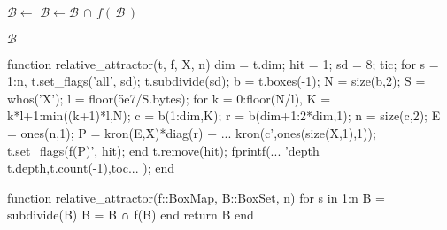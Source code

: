 \documentclass[12pt,a4paper,twoside]{article}
\begin{document}

\begin{algorithm}
    \begin{algorithmic}[1]
            
                \State $\mathcal{B} \gets$ 
                \State $\mathcal{B} \gets \mathcal{B}\, \cap\, f (\,\mathcal{B}\,)$
            \EndFor

            \State \Return $\mathcal{B}$ 
        \EndFunction
    \end{algorithmic}
\end{algorithm}

\clearpage

\pagebreak

\begin{jllisting}[float, language=matlab, style=jlcodestyle, label=lst:gum:matlab, captionpos=b]
function relative_attractor(t, f, X, n)
dim = t.dim; hit = 1; sd = 8; tic;
for s = 1:n,
    t.set_flags('all', sd);
    t.subdivide(sd);
    b = t.boxes(-1); N = size(b,2);
    S = whos('X'); l = floor(5e7/S.bytes);
    for k = 0:floor(N/l), 
        K = k*l+1:min((k+1)*l,N);
        c = b(1:dim,K);  
        r = b(dim+1:2*dim,1);  
        n = size(c,2); E = ones(n,1);       
        P = kron(E,X)*diag(r) + ...  
            kron(c',ones(size(X,1),1));
        t.set_flags(f(P)', hit); 
    end
    t.remove(hit); 
    fprintf(...
        'depth %
        t.depth,t.count(-1),toc...
    );
end
\end{jllisting}

\clearpage

\pagebreak

\begin{jllisting}[float, language=julia, style=jlcodestyle, label=lst:gum:julia, captionpos=b]
function relative_attractor(f::BoxMap, B::BoxSet, n)
    for s in 1:n
        B = subdivide(B)
        B = B ∩ f(B)
    end
    return B
end
\end{jllisting}
\end{document}
